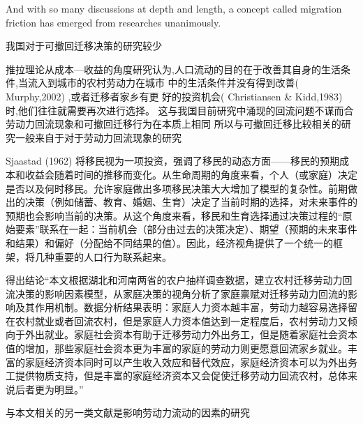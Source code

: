 \documentclass[a4paper,12pt]{article}
\begin{document}
And with so many discussions at depth and length, a concept called migration friction has emerged from researches unanimously. 




















我国对于可撤回迁移决策的研究较少

推拉理论从成本—收益的角度研究认为,人口流动的目的在于改善其自身的生活条件,当流入到城市的农村劳动力在城市  中的生活条件并没有得到改善( Murphy,2002) ,或者迁移者家乡有更  好的投资机会( Christiansen \& Kidd,1983) 时,他们往往就需要再次进行选择。
这与我国目前研究中涌现的回流问题不谋而合
劳动力回流现象和可撤回迁移行为在本质上相同
所以与可撤回迁移比较相关的研究一般来自于对于劳动力回流现象的研究


Sjaastad (1962) 将移民视为一项投资，强调了移民的动态方面——移民的预期成本和收益会随着时间的推移而变化。从生命周期的角度来看，个人（或家庭）决定是否以及何时移民。允许家庭做出多项移民决策大大增加了模型的复杂性。前期做出的决策（例如储蓄、教育、婚姻、生育）决定了当前时期的选择，对未来事件的预期也会影响当前的决策。从这个角度来看，移民和生育选择通过决策过程的“原始要素”联系在一起：当前机会（部分由过去的决策决定）、期望（预期的未来事件和结果）和偏好（分配给不同结果的值）。因此，经济视角提供了一个统一的框架，将几种重要的人口行为联系起来。


\cite{ShiZhiLeiJiaTingBingFuJiaTingJueCeYuNongCunQianYiLaoDongLiHuiLiu2012}得出结论“本文根据湖北和河南两省的农户抽样调查数据，建立农村迁移劳动力回流决策的影响因素模型，从家庭决策的视角分析了家庭禀赋对迁移劳动力回流的影响及其作用机制。数据分析结果表明：家庭人力资本越丰富，劳动力越容易选择留在农村就业或者回流农村，但是家庭人力资本值达到一定程度后，农村劳动力又倾向于外出就业。家庭社会资本有助于迁移劳动力外出务工，但是随着家庭社会资本值的增加，那些家庭社会资本更为丰富的家庭的劳动力则更愿意回流家乡就业。丰富的家庭经济资本同时可以产生收入效应和替代效应，家庭经济资本可以为外出务工提供物质支持，但是丰富的家庭经济资本又会促使迁移劳动力回流农村，总体来说后者更为明显。”

\cite{RenYuanNongCunWaiChuLaoDongLiHuiLiuQianYiDeYingXiangYinSuHeHuiLiuXiaoYing2017}







与本文相关的另一类文献是影响劳动力流动的因素的研究
\end{document}
